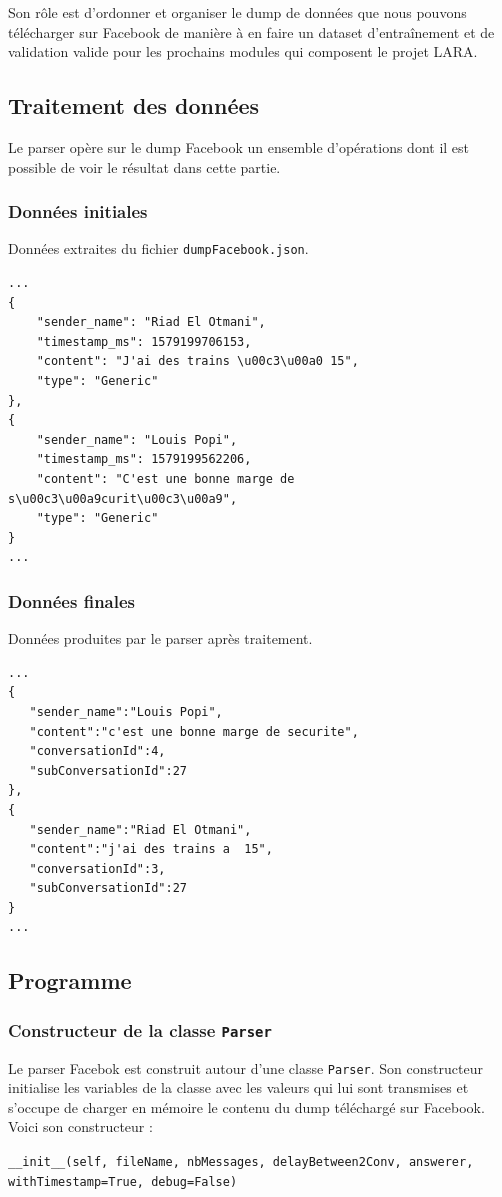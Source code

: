 \documentclass[10pt,a4paper]{article}
\begin{document}
Son rôle est d'ordonner et organiser le dump de données que nous pouvons télécharger sur Facebook de manière à en faire un dataset d'entraînement et de validation valide pour les prochains modules qui composent le projet LARA.

\subsection{Traitement des données}
Le parser opère sur le dump Facebook un ensemble d'opérations dont il est possible de voir le résultat dans cette partie.

\subsubsection{Données initiales}
Données extraites du fichier \texttt{dumpFacebook.json}.
\begin{verbatim}
...
{
    "sender_name": "Riad El Otmani",
    "timestamp_ms": 1579199706153,
    "content": "J'ai des trains \u00c3\u00a0 15",
    "type": "Generic"
},
{
    "sender_name": "Louis Popi",
    "timestamp_ms": 1579199562206,
    "content": "C'est une bonne marge de s\u00c3\u00a9curit\u00c3\u00a9",
    "type": "Generic"
}
...
\end{verbatim}

\subsubsection{Données finales}
Données produites par le parser après traitement.
\begin{verbatim}
...
{
   "sender_name":"Louis Popi",
   "content":"c'est une bonne marge de securite",
   "conversationId":4,
   "subConversationId":27
},
{
   "sender_name":"Riad El Otmani",
   "content":"j'ai des trains a  15",
   "conversationId":3,
   "subConversationId":27
}
...
\end{verbatim}
\subsection{Programme}
\subsubsection{Constructeur de la classe \texttt{Parser}}
Le parser Facebok est construit autour d'une classe \texttt{Parser}. Son constructeur initialise les variables de la classe avec les valeurs qui lui sont transmises et s'occupe de charger en mémoire le contenu du dump téléchargé sur Facebook.  Voici son constructeur :
\begin{center}
	\texttt{\_\_init\_\_(self, fileName, nbMessages, delayBetween2Conv, answerer, withTimestamp=True, debug=False)}
\end{center}
\end{document}
